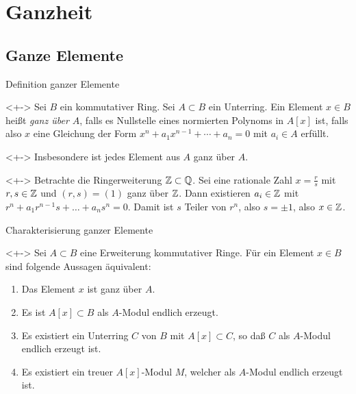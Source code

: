 \section{Ganzheit}

\subsection{Ganze Elemente}

\begin{frame}{Definition ganzer Elemente}
	\begin{definition}<+->
		Sei \(B\) ein kommutativer Ring. Sei \(A \subset B\) ein Unterring.
		Ein Element \(x \in B\) heißt \emph{ganz über \(A\)}, falls es
		Nullstelle eines normierten Polynoms in \(A[x]\) ist, falls also
		\(x\) eine Gleichung der Form \(x^n + a_1 x^{n - 1} + \dotsb + a_n = 0\)
		mit \(a_i \in A\) erfüllt.
	\end{definition}
	\begin{visibleenv}<+->
		Insbesondere ist jedes Element aus \(A\) ganz über \(A\).
	\end{visibleenv}
	\begin{example}<+->
		Betrachte die Ringerweiterung \(\mathbb Z \subset \mathbb Q\). Sei eine
		rationale Zahl \(x = \frac r s\) mit \(r, s \in \mathbb Z\) und
		\((r, s) = (1)\) ganz über \(\mathbb Z\). Dann existieren
		\(a_i \in \mathbb Z\) mit \(r^n + a_1 r^{n - 1} s + \dotsc + a_n s^n = 0\).
		Damit ist \(s\) Teiler von \(r^n\), also \(s = \pm 1\), also \(x \in
		\mathbb Z\).
	\end{example}
\end{frame}

\begin{frame}{Charakterisierung ganzer Elemente}
	\begin{proposition}<+->
                \label{prop:characterization-integral-elements}
		Sei \(A \subset B\) eine Erweiterung kommutativer Ringe. Für ein
		Element \(x \in B\) sind folgende Aussagen äquivalent:
		\begin{enumerate}[<+->]
		\item
			Das Element \(x\) ist ganz über \(A\).
		\item
			Es ist \(A[x] \subset B\) als \(A\)-Modul endlich erzeugt.
		\item
			Es existiert ein Unterring \(C\) von \(B\) mit \(A[x] \subset C\),
			so daß \(C\) als \(A\)-Modul endlich erzeugt ist.
		\item
			Es existiert ein treuer \(A[x]\)-Modul \(M\), welcher als
			\(A\)-Modul endlich erzeugt ist.
		\end{enumerate}
	\end{proposition}
\end{frame}

